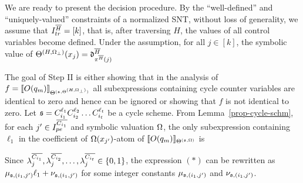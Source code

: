 We are ready to present the decision procedure. By the ``well-defined'' and ``uniquely-valued'' constraints of a normalized SNT, without loss of generality, we assume that $I^{\overline{H}}_{tr}=[k]$, that is, after traversing $H$, the values of all control variables become defined.
Under the assumption, for all $j \in [k]$, the symbolic value of $\Theta^{(H,\Omega_\bot)}(x_j)=\mathfrak{d}^{\overline{H}}_{\pi^{\overline{H}}(j)}$\smallskip\\
\bigskip


The goal of Step II is either showing that in the analysis of $f=\llbracket O(q_m)\rrbracket_{\Theta^{({\mathfrak{s} },\Theta^{(H,\Omega_\bot)})}}$ all subexpressions containing cycle counter variables are identical to zero and hence can be ignored or showing that $f$ is not identical to zero. Let ${\mathfrak{s} }=C_{i_1}^{\ell_1} C_{i_2}^{\ell_2} \dots C_{i_t}^{\ell_t}$ be a cycle scheme. From Lemma~\ref{prop-cycle-schm}, for each $j'\in I^{\overline{C_{i_1}}}_{pe}$ and symbolic valuation $\Omega$, the only subexpression containing $\ell_1$ in the coefficient of $\Omega(x_{j'})$-atom of $\llbracket O(q_m)\rrbracket_{\Theta^{({\mathfrak{s} },\Omega)}}$ is
\begin{center}
\end{center}
Since $\lambda^{\overline{C_{i_1}}}_{j}, \lambda^{\overline{C_{i_2}}}_{j}, \dots, \lambda^{\overline{C_{i_t}}}_{j} \in \{0, 1\}$, the expression $(\ast)$  can be rewritten as  
 $\mu_{{\mathfrak{s} }, (i_1,j')} \ell_1 + \nu_{{\mathfrak{s} }, (i_1,j')}$ for some integer constants $\mu_{{\mathfrak{s} }, (i_1,j')}$ and $\nu_{{\mathfrak{s} }, (i_1,j')}$. 
 
